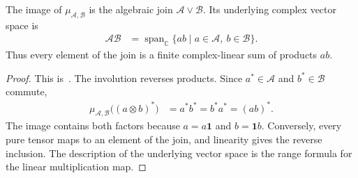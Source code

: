 \begin{lemma}
    \label{thm:qca_commuting_factor_product}
    \leanok
    The image of $\mu_{\mathcal A,\mathcal B}$ is the algebraic join
    $\mathcal A\vee\mathcal B$.  Its underlying complex vector space is
    \begin{align}
        \mathcal A\mathcal B
         & =\operatorname{span}_{\mathbb C}
        \{ab\mid a\in\mathcal A,\ b\in\mathcal B\}.
        \label{eq:qca_commuting_factor_product_span}
    \end{align}
    Thus every element of the join is a finite complex-linear sum of
    products $ab$.
\end{lemma}

\begin{proof}\leanok
    This is~\cite[``Algebraic product of commuting
        factors'']{QICLean2026Blueprint}.
    The involution reverses products.  Since $a^*\in\mathcal A$ and
    $b^*\in\mathcal B$ commute,
    \begin{align}
        \mu_{\mathcal A,\mathcal B}\bigl((a\otimes b)^*\bigr)
         & =a^*b^*=b^*a^*=(ab)^*.
    \end{align}
    The image contains both factors because $a=a\mathbf 1$ and
    $b=\mathbf 1b$.  Conversely, every pure tensor maps to an element of
    the join, and linearity gives the reverse inclusion.  The description
    of the underlying vector space is the range formula for the linear
    multiplication map.
\end{proof}

